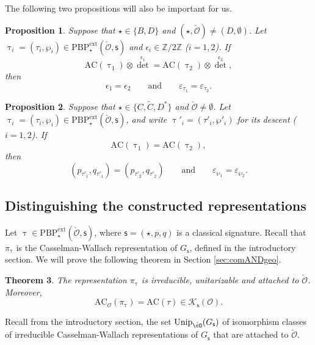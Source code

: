 \documentclass[12pt,a4paper]{amsart}
\newcommand{\CK}{{\mathcal {K}}}
\newcommand{\CO}{{\mathcal {O}}}
\newcommand{\Z}{\mathbb{Z}}
\numberwithin{equation}{section}
\newtheorem{thm}{Theorem}[section]
\newtheorem{prop}[thm]{Proposition}
\theoremstyle{remark}
\def\Unip{\mathrm{Unip}}
\def\PBPe{\mathrm{PBP}^{\mathrm{ext}}}
\begin{document}
The following two propositions will also be important for us.
\begin{prop}\label{thmac4}
Suppose that  $\star\in \{B,D\}$ and $(\star, \check \CO)\neq (D, \emptyset)$. Let $\uptau_i=(\tau_i, \wp_i)\in \PBPe_\star(\check \CO,\mathsf s)$ and $\epsilon_i\in \Z/2\Z$ ($i=1,2$).   If
\[
  \mathrm{AC}(\uptau_1)\otimes {\det}^{\epsilon_1}= \mathrm{AC}(\uptau_2)\otimes {\det}^{\epsilon_2},
\]
then
\[
  \epsilon_1=\epsilon_2\qquad\textrm{and}\qquad \varepsilon_{\tau_1}=\varepsilon_{\tau_2}.
\]
 \end{prop}


\begin{prop}\label{thmac5}
Suppose that  $\star\in \{C,\widetilde C, D^*\}$ and $\check \CO\neq \emptyset$. Let $\uptau_i=(\tau_i, \wp_i)\in \PBPe_\star(\check \CO,\mathsf s)$, and write $\uptau'_i=(\tau'_i, \wp'_i)$ for its descent ($i=1,2$).   If
\[
  \mathrm{AC}(\uptau_1)= \mathrm{AC}(\uptau_2),
\]
then
\[
 ( p_{\tau'_1}, q_{\tau'_1})=( p_{\tau'_2}, q_{\tau'_2})\qquad\textrm{and}\qquad \varepsilon_{\wp_1}=\varepsilon_{\wp_2}.
\]
 \end{prop}

\subsection{Distinguishing the constructed representations}


Let $\uptau\in \PBPe_\star(\check \CO,\mathsf s)$, where $\mathsf s=(\star, p,q)$ is a classical signature. Recall that $\pi_\uptau$ is the Casselman-Wallach representation of $G_{\mathsf s}$, defined in the introductory section.
We will prove the following theorem in Section \ref{sec:comANDgeo}.

\begin{thm}\label{thmpitau}
The representation $\pi_\uptau$ is irreducible, unitarizable and attached to $\check \CO$. Moreover, 
\[
\mathrm{AC}_\CO(\pi_\uptau)=\mathrm{AC}(\tau)\in \CK_{\mathsf s}(\CO).
\]
\end{thm}


Recall from the introductory section, the set $\Unip_{\check \cO}(G_\mathsf s)$ of isomorphism classes of irreducible Casselman-Wallach representations of $G_\mathsf s$ that are attached to $\check \CO$.
\end{document}
